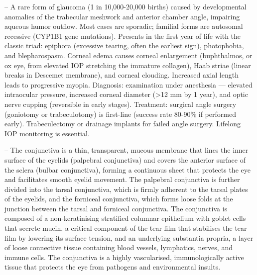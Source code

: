 -- A rare form of glaucoma (1 in 10,000-20,000 births) caused by developmental anomalies of the trabecular meshwork and anterior chamber angle, impairing aqueous humor outflow. Most cases are sporadic; familial forms are autosomal recessive (CYP1B1 gene mutations). Presents in the first year of life with the classic triad: epiphora (excessive tearing, often the earliest sign), photophobia, and blepharospasm. Corneal edema causes corneal enlargement (buphthalmos, or ox eye, from elevated IOP stretching the immature collagen), Haab striae (linear breaks in Descemet membrane), and corneal clouding. Increased axial length leads to progressive myopia. Diagnosis: examination under anesthesia — elevated intraocular pressure, increased corneal diameter (>12 mm by 1 year), and optic nerve cupping (reversible in early stages). Treatment: surgical angle surgery (goniotomy or trabeculotomy) is first-line (success rate 80-90\% if performed early). Trabeculectomy or drainage implants for failed angle surgery. Lifelong IOP monitoring is essential.

-- The conjunctiva is a thin, transparent, mucous membrane that lines the inner surface of the eyelids (palpebral conjunctiva) and covers the anterior surface of the sclera (bulbar conjunctiva), forming a continuous sheet that protects the eye and facilitates smooth eyelid movement. The palpebral conjunctiva is further divided into the tarsal conjunctiva, which is firmly adherent to the tarsal plates of the eyelids, and the forniceal conjunctiva, which forms loose folds at the junction between the tarsal and forniceal conjunctiva. The conjunctiva is composed of a non-keratinising stratified columnar epithelium with goblet cells that secrete mucin, a critical component of the tear film that stabilises the tear film by lowering its surface tension, and an underlying substantia propria, a layer of loose connective tissue containing blood vessels, lymphatics, nerves, and immune cells. The conjunctiva is a highly vascularised, immunologically active tissue that protects the eye from pathogens and environmental insults.

